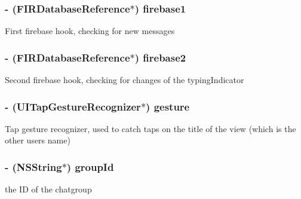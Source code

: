 \subsubsection[{firebase1}]{\setlength{\rightskip}{0pt plus 5cm}-\/ ({\bf F\+I\+R\+Database\+Reference}$\ast$) firebase1\hspace{0.3cm}{\ttfamily [protected]}}\label{category_e_s_chat_view_07_08_a360719a0fafbeb2f8d397412b111eba1}
First firebase hook, checking for new messages \hypertarget{category_e_s_chat_view_07_08_a969bd46aaca026c38170c417dcbec4b0}{}
\subsubsection[{firebase2}]{\setlength{\rightskip}{0pt plus 5cm}-\/ ({\bf F\+I\+R\+Database\+Reference}$\ast$) firebase2\hspace{0.3cm}{\ttfamily [protected]}}\label{category_e_s_chat_view_07_08_a969bd46aaca026c38170c417dcbec4b0}
Second firebase hook, checking for changes of the typing\+Indicator \hypertarget{category_e_s_chat_view_07_08_a66804a0dfa11245e36e7aeeef8aab943}{}
\subsubsection[{gesture}]{\setlength{\rightskip}{0pt plus 5cm}-\/ (U\+I\+Tap\+Gesture\+Recognizer$\ast$) gesture\hspace{0.3cm}{\ttfamily [protected]}}\label{category_e_s_chat_view_07_08_a66804a0dfa11245e36e7aeeef8aab943}
Tap gesture recognizer, used to catch taps on the title of the view (which is the other user\textquotesingle{}s name) \hypertarget{category_e_s_chat_view_07_08_a19b2a33c9b2182e9453855654c540857}{}
\subsubsection[{group\+Id}]{\setlength{\rightskip}{0pt plus 5cm}-\/ (N\+S\+String$\ast$) group\+Id\hspace{0.3cm}{\ttfamily [protected]}}\label{category_e_s_chat_view_07_08_a19b2a33c9b2182e9453855654c540857}
the I\+D of the chatgroup \hypertarget{category_e_s_chat_view_07_08_a20cb702c2056f87f259c409b897db21d}{}

